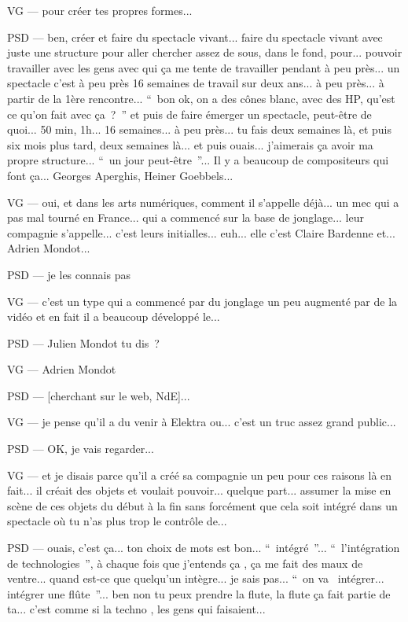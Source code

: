 VG — pour créer tes propres formes...

PSD — ben, créer et faire du spectacle vivant... faire du spectacle vivant avec juste une structure pour aller chercher assez de sous, dans le fond, pour... pouvoir travailler avec les gens avec qui ça me tente de travailler pendant à peu près... un spectacle c'est à peu près 16 semaines de travail sur deux ans... à peu près... à partir de la 1ère rencontre... “ bon ok, on a des cônes blanc, avec des HP, qu'est ce qu'on fait avec ça ? ” et puis de faire émerger un spectacle, peut-être de quoi... 50 min, 1h... 16 semaines... à peu près... tu fais deux semaines là,  et puis six mois plus tard, deux semaines là... et puis ouais... j'aimerais ça avoir ma propre structure... “ un jour peut-être ”... Il y a beaucoup de compositeurs qui font ça... Georges Aperghis, Heiner Goebbels...

VG — oui, et dans les arts numériques, comment il s'appelle déjà... un mec qui a pas mal tourné en France... qui a commencé sur la base de jonglage... leur compagnie s'appelle... c'est leurs initialles... euh... elle c'est Claire Bardenne et... Adrien Mondot...

PSD — je les connais pas

VG — c'est un type qui a commencé par du jonglage un peu  augmenté par de la vidéo et en fait il a beaucoup développé le...

PSD — Julien Mondot tu dis ?

VG — Adrien Mondot 

PSD — [cherchant sur le web, NdE]...

VG — je pense qu'il a du venir à Elektra ou... c'est un truc assez grand public...

PSD — OK, je vais regarder...

VG — et je disais parce qu'il a créé sa compagnie un peu pour ces raisons là en fait... il créait des objets et voulait pouvoir... quelque part... assumer la mise en scène de ces objets du début à la fin sans forcément que cela soit intégré dans un spectacle où tu n'as plus trop le contrôle de...

PSD — ouais, c'est ça... ton choix de mots est bon... “ intégré ”... “ l'intégration de technologies ”,  à chaque fois que j'entends ça , ça me fait des maux de ventre... quand est-ce que quelqu'un intègre... je sais pas... “ on va  intégrer... intégrer une flûte ”... ben non tu peux prendre la flute, la flute ça fait partie de ta... c'est comme si la techno , les gens qui faisaient...

